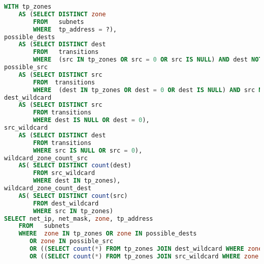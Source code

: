%
%

\begin{lstlisting}[language=SQL, breaklines=True, caption=Get Subnets Query, label=Get Subnets Query, sensitive=true]
WITH tp_zones
	AS (SELECT DISTINCT zone 
		FROM   subnets 
		WHERE  tp_address = ?), 
possible_dests 
	AS (SELECT DISTINCT dest
		FROM   transitions 
		WHERE  (src IN tp_zones OR src = 0 OR src IS NULL) AND dest NOT IN tp_zones), 
possible_src 
	AS (SELECT DISTINCT src
		FROM  transitions 
		WHERE  (dest IN tp_zones OR dest = 0 OR dest IS NULL) AND src NOT IN tp_zones),
dest_wildcard
	AS (SELECT DISTINCT src
		FROM transitions 
		WHERE dest IS NULL OR dest = 0),
src_wildcard
	AS (SELECT DISTINCT dest
		FROM transitions
		WHERE src IS NULL OR src = 0), 
wildcard_zone_count_src
	AS(	SELECT DISTINCT count(dest) 
		FROM src_wildcard
		WHERE dest IN tp_zones),
wildcard_zone_count_dest
	AS(	SELECT DISTINCT count(src) 
		FROM dest_wildcard
		WHERE src IN tp_zones)
SELECT net_ip, net_mask, zone, tp_address 
	FROM   subnets 
	WHERE  zone IN tp_zones OR zone IN possible_dests
	   OR zone IN possible_src
	   OR ((SELECT count(*) FROM tp_zones JOIN dest_wildcard WHERE zone = src) > 0)
	   OR ((SELECT count(*) FROM tp_zones JOIN src_wildcard WHERE zone = dest) > 0)
\end{lstlisting}